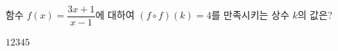 \hspace*{2mm}\begin{minipage}[t]{\dimexpr\linewidth-2mm\relax}\vspace{0pt}
함수 $f(x)=\dfrac{3x+1}{x-1}$에 대하여 $(f\circ f)(k)=4$를 만족시키는 상수 $k$의 값은?
\begin{choices32}{$1$}{$2$}{$3$}{$4$}{$5$}\end{choices32}\end{minipage}
